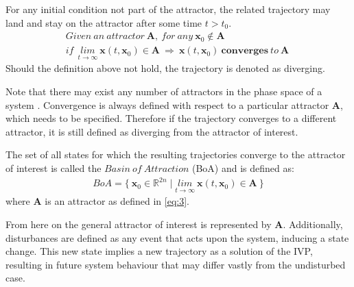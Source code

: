     For any initial condition not part of the attractor, the related trajectory may land and stay on the attractor after some time $t > t_0$. 
    \begin{gather} \label{eq:6} Given\ an\ attractor\ \mathbf{A},\ for\ any\ \mathbf{x}_0 \notin \mathbf{A}\\ if\ \ \underset{t \rightarrow \infty}{lim} \ \mathbf{x}(t,\mathbf{x}_0) \in \mathbf{A}\ \Rightarrow\
    \mathbf{x}(t,\mathbf{x}_0)\ \mathbf{converges}\ to\ \mathbf{A}\ \end{gather}
    Should the definition above not hold, the trajectory is denoted as diverging. 

    Note that there may exist any number of attractors in the phase space of a system \cite{sixdim}. Convergence is always defined with respect to a particular attractor $\mathbf{A}$, which needs to be specified. Therefore if the trajectory converges to a different attractor, it is still defined as diverging from the attractor of interest.  

    The set of all states for which the resulting trajectories converge to the attractor of interest is called the $Basin\ of\ Attraction$ (BoA) and is defined as: 
    \begin{gather} \label{eq:7} BoA = \{\ \mathbf{x}_0 \in \mathbb{R}^{2n} \mid  \underset{t \rightarrow \infty}{lim} \ \mathbf{x}(t,\mathbf{x}_0) \in \mathbf{A}\ \}\end{gather}
    where $\mathbf{A}$ is an attractor as defined in \ref{eq:3}.

    From here on the general attractor of interest is represented by $\mathbf{A}$.
    Additionally, disturbances are defined as any event that acts upon the system, inducing a state change. This new state implies a new trajectory as a solution of the IVP, resulting in future system behaviour that may differ vastly from the undisturbed case.





